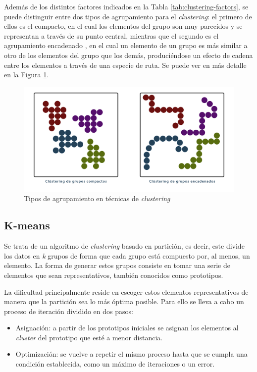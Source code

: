 Además de los distintos factores indicados en la Tabla \ref{tab:clustering-factors}, se puede distinguir entre dos tipos de agrupamiento para el \textit{clustering}: el primero de ellos es el compacto, en el cual los elementos del grupo son muy parecidos y se representan a través de su punto central, mientras que el segundo es el agrupamiento encadenado \cite{https://doi.org/10.1002/widm.30}, en el cual un elemento de un grupo es más similar a otro de los elementos del grupo que los demás, produciéndose un efecto de cadena entre los elementos a través de una especie de ruta. Se puede ver en más detalle en la Figura \ref{fig:agrupamiento-clustering}.

\begin{figure}[H]
    \centering
    \includegraphics[width=0.75\linewidth]{imagenes/tipos-grupos-clustering.png}
    \caption{Tipos de agrupamiento en técnicas de \textit{clustering}} 
    \label{fig:agrupamiento-clustering}
\end{figure}

\newpage

\subsection{K-means}
\label{k-means}
Se trata de un algoritmo de \textit{clustering} basado en partición, es decir, este divide los datos en \textit{k} grupos de forma que cada grupo está compuesto por, al menos, un elemento. La forma de generar estos grupos consiste en tomar una serie de elementos que sean representativos, también conocidos como prototipos. 

La dificultad principalmente reside en escoger estos elementos representativos de manera que la partición sea lo más óptima posible. Para ello se lleva a cabo un proceso de iteración dividido en dos pasos:
\begin{itemize}
    \item Asignación: a partir de los prototipos iniciales se asignan los elementos al \textit{cluster} del prototipo que esté a menor distancia.
    \item Optimización: se vuelve a repetir el mismo proceso hasta que se cumpla una condición establecida, como un máximo de iteraciones o un error.
\end{itemize}

